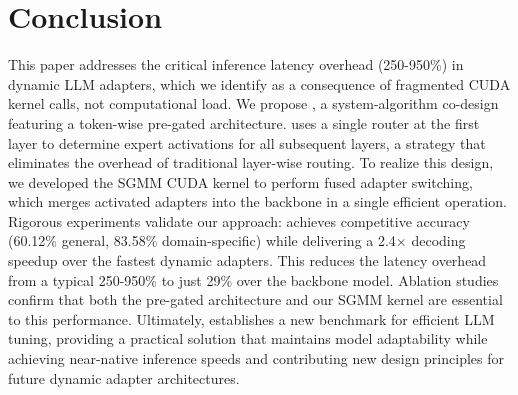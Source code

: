 
\section{Conclusion}

This paper addresses the critical inference latency overhead (250-950\%) in dynamic LLM adapters, which we identify as a consequence of fragmented CUDA kernel calls, not computational load. We propose \sys, a system-algorithm co-design featuring a token-wise pre-gated architecture. \sys uses a single router at the first layer to determine expert activations for all subsequent layers, a strategy that eliminates the overhead of traditional layer-wise routing.
% 
To realize this design, we developed the SGMM CUDA kernel to perform fused adapter switching, which merges activated adapters into the backbone in a single efficient operation. Rigorous experiments validate our approach: \sys achieves competitive accuracy (60.12\% general, 83.58\% domain-specific) while delivering a 2.4× decoding speedup over the fastest dynamic adapters. This reduces the latency overhead from a typical 250-950\% to just 29\% over the backbone model.
% 
Ablation studies confirm that both the pre-gated architecture and our SGMM kernel are essential to this performance. Ultimately, \sys establishes a new benchmark for efficient LLM tuning, providing a practical solution that maintains model adaptability while achieving near-native inference speeds and contributing new design principles for future dynamic adapter architectures.

